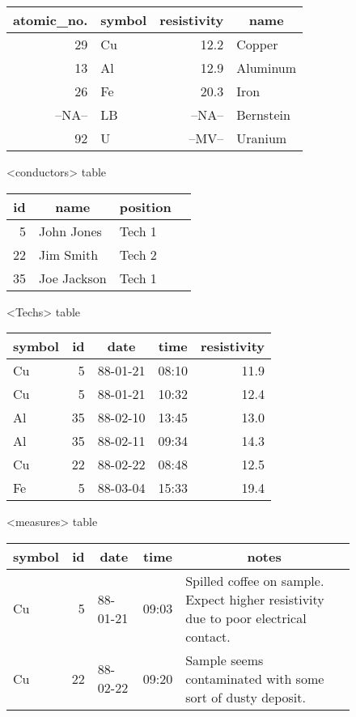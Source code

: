  
\begin{figure}[htp]
\begin{center}
  \begin{tabular}[t]{|r|l|r|l|}
     \hline
     \multicolumn{1}{|c|}{atomic_no.}&
     \multicolumn{1}{|c|}{symbol}&
     \multicolumn{1}{|c|}{resistivity}&
     \multicolumn{1}{|c|}{name}\\
     \hline
    29& Cu& 12.2  & Copper\\
    13& Al& 12.9  & Aluminum\\
    26& Fe& 20.3  & Iron\\
--NA--& LB&--NA--& Bernstein\\
    92& U &--MV--  & Uranium\\
     \hline
  \end{tabular}
 
  \smallskip
          {<conductors> table }
 
  \bigskip
  \begin{tabular}[t]{|r|l|l|l|}
     \hline
     \multicolumn{1}{|c|}{id}&
     \multicolumn{1}{|c|}{name}&
     \multicolumn{1}{|c|}{position}\\
     \hline
     5& John Jones& Tech 1\\
    22& Jim Smith& Tech 2\\
    35& Joe Jackson& Tech 1\\
     \hline
  \end{tabular}
 
  \smallskip
          {<Techs> table }
 
  \bigskip
  \begin{tabular}[t]{|l|r|l|l|r|}
     \hline
     \multicolumn{1}{|c|}{symbol}&
     \multicolumn{1}{|c|}{id}&
     \multicolumn{1}{|c|}{date}&
     \multicolumn{1}{|c|}{time}&
     \multicolumn{1}{|c|}{resistivity}\\
     \hline
    Cu& 5& 88-01-21& 08:10& 11.9 \\
    Cu& 5& 88-01-21& 10:32& 12.4 \\
    Al&35& 88-02-10& 13:45& 13.0 \\
    Al&35& 88-02-11& 09:34& 14.3 \\
    Cu&22& 88-02-22& 08:48& 12.5 \\
    Fe& 5& 88-03-04& 15:33& 19.4 \\
     \hline
  \end{tabular}
 
  \medskip
          {<measures> table }
 
  \bigskip
  \begin{tabular}[t]{|l|r|l|l|p{2.0in}|}
     \hline
     \multicolumn{1}{|c|}{symbol}&
     \multicolumn{1}{|c|}{id}&
     \multicolumn{1}{|c|}{date}&
     \multicolumn{1}{|c|}{time}&
     \multicolumn{1}{|c|}{notes}\\
     \hline
    Cu& 5& 88-01-21& 09:03& Spilled coffee on sample.  Expect higher
        resistivity due to poor electrical contact.\\
    Cu&22& 88-02-22& 09:20& Sample seems contaminated with some
        sort of dusty deposit.\\
     \hline
  \end{tabular}
 

\end{center}
\end{figure}

